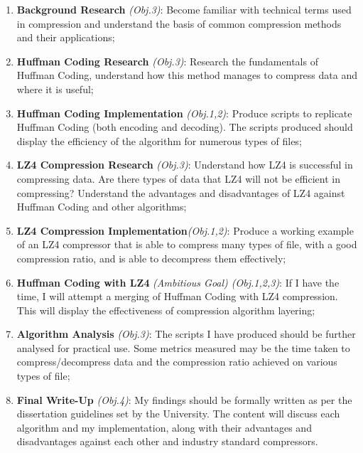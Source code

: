 \documentclass[12pt]{article}
\begin{document}
	\begin{enumerate}
		\item \textbf{Background Research} \emph{(Obj.3)}: Become familiar with technical terms used in compression and understand the basis of common compression methods and their applications;
		
		\item \textbf{Huffman Coding Research} \emph{(Obj.3)}: Research the fundamentals of Huffman Coding, understand how this method manages to compress data and where it is useful;
		
		\item \textbf{Huffman Coding Implementation} \emph{(Obj.1,2)}: Produce scripts to replicate Huffman Coding (both encoding and decoding). The scripts produced should display the efficiency of the algorithm for numerous types of files;
		
		\item \textbf{LZ4 Compression Research} \emph{(Obj.3)}: Understand how LZ4 is successful in compressing data. Are there types of data that LZ4 will not be efficient in compressing? Understand the advantages and disadvantages of LZ4 against Huffman Coding and other algorithms;
		
		\item \textbf{LZ4 Compression Implementation}\emph{(Obj.1,2)}: Produce a working example of an LZ4 compressor that is able to compress many types of file, with a good compression ratio, and is able to decompress them effectively;
		
		\item \textbf{Huffman Coding with LZ4} \emph{{(Ambitious Goal) (Obj.1,2,3)}}: If I have the time, I will attempt a merging of Huffman Coding with LZ4 compression. This will display the effectiveness of compression algorithm layering;
		
		\item \textbf{Algorithm Analysis} \emph{(Obj.3)}: The scripts I have produced should be further analysed for practical use. Some metrics measured may be the time taken to compress/decompress data and the compression ratio achieved on various types of file;
		
		\item \textbf{Final Write-Up} \emph{(Obj.4)}: My findings should be formally written as per the dissertation guidelines set by the University. The content will discuss each algorithm and my implementation, along with their advantages and disadvantages against each other and industry standard compressors.
	\end{enumerate}
\end{document}
